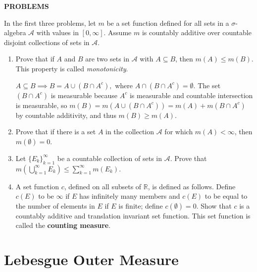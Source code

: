 \documentclass[a4paper,10pt]{book}
\theoremstyle{plain} %
\begin{document}
\begin{center}
	\textbf{PROBLEMS}
\end{center}
In the first three problems, let $m$ be a set function defined for all sets in a $\sigma$-algebra $\mathcal{A}$ with values in $[0,\infty]$. Assume $m$ is countably additive over countable disjoint collections of sets in $\mathcal{A}$.
\begin{enumerate}
	\setcounter{enumi}{0}
	\item Prove that if $A$ and $B$ are two sets in $\mathcal{A}$ with $A \subseteq B$, then $m(A) \le m(B)$. This property is called \textit{monotonicity}.\par
	$A \subseteq B \implies B = A \cup (B \cap A^c),$ where $A \cap (B \cap A^c) = \emptyset$. The set $(B \cap A^c)$ is measurable because $A^c$ is measurable and countable intersection is measurable, so $m(B) = m(A \cup (B \cap A^c)) = 	m(A) + m(B \cap A^c)$ by countable additivity, and thus $m(B) \ge m(A)$.
	\item Prove that if there is a set $A$ in the collection $\mathcal{A}$ for which $m(A) < \infty$, then $m(\emptyset) = 0$.\par
	
	\item Let $\{E_k\}_{k=1}^\infty$ be a countable collection of sets in $\mathcal{A}$. Prove that $m(\bigcup_{k=1}^\infty E_k) \le \sum_{k=1}^\infty m(E_k).$
	\item A set function $c$, defined on all subsets of $\mathbb{R}$, is defined as follows.
	Define $c(E)$ to be $\infty$ if $E$ has infinitely many members and $c(E)$ to be equal to the number of elements in $E$ if $E$ is finite; define $c(\emptyset)=0$. Show that $c$ is a countably additive and translation invariant set function. This set function is called the \textbf{counting measure}.
\end{enumerate}


\section{Lebesgue Outer Measure}
\end{document}

